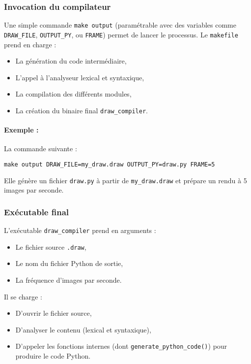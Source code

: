 \documentclass[12pt,a4paper]{article}
\begin{document}
\subsubsection{Invocation du compilateur}
Une simple commande \texttt{make output} (paramétrable avec des variables comme \texttt{DRAW\_FILE}, \texttt{OUTPUT\_PY}, ou \texttt{FRAME}) permet de lancer le processus. Le \texttt{makefile} prend en charge :
\begin{itemize}
    \item La génération du code intermédiaire,
    \item L’appel à l’analyseur lexical et syntaxique,
    \item La compilation des différents modules,
    \item La création du binaire final \texttt{draw\_compiler}.
\end{itemize}

\paragraph*{Exemple :}
La commande suivante :
\begin{verbatim}
make output DRAW_FILE=my_draw.draw OUTPUT_PY=draw.py FRAME=5
\end{verbatim} 

Elle génère un fichier \texttt{draw.py} à partir de \texttt{my\_draw.draw} et prépare un rendu à 5 images par seconde.

\subsubsection{Exécutable final}
L’exécutable \texttt{draw\_compiler} prend en arguments :
\begin{itemize}
    \item Le fichier source \texttt{.draw},
    \item Le nom du fichier Python de sortie,
    \item La fréquence d’images par seconde.
\end{itemize}

Il se charge :
\begin{itemize}
    \item D’ouvrir le fichier source,
    \item D’analyser le contenu (lexical et syntaxique),
    \item D’appeler les fonctions internes (dont \texttt{generate\_python\_code()}) pour produire le code Python.
\end{itemize}
\end{document}
